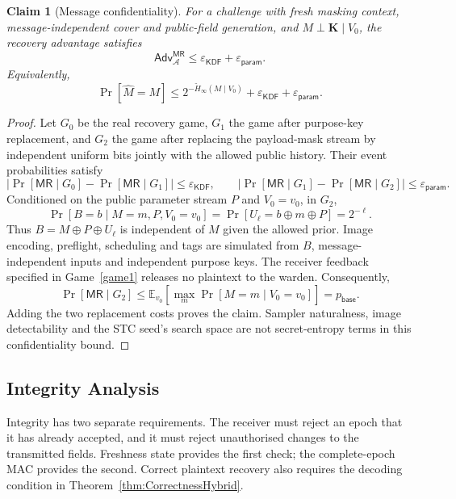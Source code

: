 \documentclass[pdflatex,sn-mathphys-num]{sn-jnl}%
\newtheorem{claim}{Claim}
\theoremstyle{definition}
\theoremstyle{game}
\theoremstyle{thmstyleone}%
\theoremstyle{thmstyletwo}%
\theoremstyle{thmstylethree}%
\begin{document}
\begin{claim}[Message confidentiality]\label{Claim2}
For a challenge with fresh masking context, message-independent cover and
public-field generation, and $M\perp\mathbf K\mid V_0$, the recovery advantage satisfies
\begin{equation}\label{eq:message_recovery_bound}
\mathsf{Adv}^{\mathsf{MR}}_{\mathcal A}
\le\varepsilon_{\mathsf{KDF}}+\varepsilon_{\mathsf{param}}.
\end{equation}
Equivalently,
\[
\Pr[\widehat M=M]\le
2^{-\widetilde H_\infty(M\mid V_0)}+
\varepsilon_{\mathsf{KDF}}+\varepsilon_{\mathsf{param}}.
\]
\end{claim}
\begin{proof}
Let $G_0$ be the real recovery game, $G_1$ the game after purpose-key
replacement, and $G_2$ the game after replacing the payload-mask stream
by independent uniform bits jointly with the allowed public history.
Their event probabilities satisfy
\[
|\Pr[\mathsf{MR}\mid G_0]-\Pr[\mathsf{MR}\mid G_1]|
\le\varepsilon_{\mathsf{KDF}},\qquad
|\Pr[\mathsf{MR}\mid G_1]-\Pr[\mathsf{MR}\mid G_2]|
\le\varepsilon_{\mathsf{param}}.
\]
Conditioned on the public parameter stream $P$ and $V_0=v_0$, in $G_2$,
\[
\Pr[B=b\mid M=m,P,V_0=v_0]
=\Pr[U_\ell=b\oplus m\oplus P]=2^{-\ell}.
\]
Thus $B=M\oplus P\oplus U_\ell$ is independent of $M$ given the allowed
prior. Image encoding, preflight, scheduling and tags are simulated from
$B$, message-independent inputs and independent purpose keys. The receiver
feedback specified in Game~\ref{game1} releases no plaintext to the warden.
Consequently,
\[
\Pr[\mathsf{MR}\mid G_2]\le
\mathbb E_{v_0}[\max_m\Pr[M=m\mid V_0=v_0]]=p_{\mathsf{base}}.
\]
Adding the two replacement costs proves the claim. Sampler naturalness,
image detectability and the STC seed's search space are not secret-entropy
terms in this confidentiality bound.
\end{proof}

\subsection{Integrity Analysis}\label{sec:integrity}
Integrity has two separate requirements. The receiver must reject an epoch
that it has already accepted, and it must reject unauthorised changes to
the transmitted fields. Freshness state provides the first check; the
complete-epoch MAC provides the second. Correct plaintext recovery also
requires the decoding condition in Theorem~\ref{thm:CorrectnessHybrid}.
\end{document}
